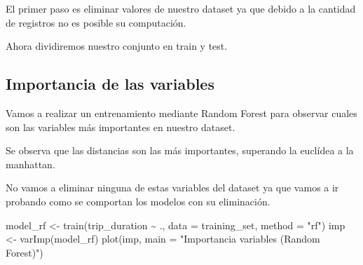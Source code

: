\documentclass[
]{article}
\newenvironment{Shaded}{\begin{snugshade}}{\end{snugshade}}
\newcommand{\AttributeTok}[1]{\textcolor[rgb]{0.77,0.63,0.00}{#1}}
\newcommand{\ConstantTok}[1]{\textcolor[rgb]{0.00,0.00,0.00}{#1}}
\newcommand{\DecValTok}[1]{\textcolor[rgb]{0.00,0.00,0.81}{#1}}
\newcommand{\FloatTok}[1]{\textcolor[rgb]{0.00,0.00,0.81}{#1}}
\newcommand{\FunctionTok}[1]{\textcolor[rgb]{0.00,0.00,0.00}{#1}}
\newcommand{\NormalTok}[1]{#1}
\newcommand{\OtherTok}[1]{\textcolor[rgb]{0.56,0.35,0.01}{#1}}
\newcommand{\SpecialCharTok}[1]{\textcolor[rgb]{0.00,0.00,0.00}{#1}}
\newcommand{\StringTok}[1]{\textcolor[rgb]{0.31,0.60,0.02}{#1}}
\begin{document}
El primer paso es eliminar valores de nuestro dataset ya que debido a la
cantidad de registros no es posible su computación.

\begin{Shaded}
\end{Shaded}

Ahora dividiremos nuestro conjunto en train y test.

\begin{Shaded}
\end{Shaded}

\hypertarget{importancia-de-las-variables}{%
\subsection{Importancia de las
variables}\label{importancia-de-las-variables}}

Vamos a realizar un entrenamiento mediante Random Forest para observar
cuales son las variables más importantes en nuestro dataset.

Se observa que las distancias son las más importantes, superando la
euclídea a la manhattan.

No vamos a eliminar ninguna de estas variables del dataset ya que vamos
a ir probando como se comportan los modelos con su eliminación.

\begin{Shaded}
\begin{Highlighting}[]
\NormalTok{model\_rf }\OtherTok{\textless{}{-}} \FunctionTok{train}\NormalTok{(trip\_duration }\SpecialCharTok{\textasciitilde{}}\NormalTok{ ., }\AttributeTok{data =}\NormalTok{ training\_set, }\AttributeTok{method =} \StringTok{"rf"}\NormalTok{)}
\NormalTok{imp }\OtherTok{\textless{}{-}} \FunctionTok{varImp}\NormalTok{(model\_rf)}
\FunctionTok{plot}\NormalTok{(imp, }\AttributeTok{main =} \StringTok{"Importancia variables (Random Forest)"}\NormalTok{)}
\end{Highlighting}
\end{Shaded}
\end{document}
